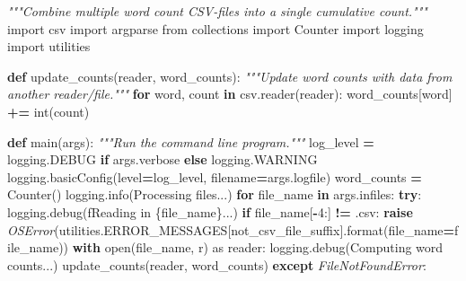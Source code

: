 \documentclass[
]{krantz}
\makeatletter
\newenvironment{Shaded}{\begin{snugshade}}{\end{snugshade}}
\newcommand{\BuiltInTok}[1]{#1}
\newcommand{\CommentTok}[1]{\textcolor[rgb]{0.56,0.35,0.01}{\textit{#1}}}
\newcommand{\ControlFlowTok}[1]{\textcolor[rgb]{0.13,0.29,0.53}{\textbf{#1}}}
\newcommand{\DecValTok}[1]{\textcolor[rgb]{0.00,0.00,0.81}{#1}}
\newcommand{\ImportTok}[1]{#1}
\newcommand{\KeywordTok}[1]{\textcolor[rgb]{0.13,0.29,0.53}{\textbf{#1}}}
\newcommand{\NormalTok}[1]{#1}
\newcommand{\OperatorTok}[1]{\textcolor[rgb]{0.81,0.36,0.00}{\textbf{#1}}}
\newcommand{\PreprocessorTok}[1]{\textcolor[rgb]{0.56,0.35,0.01}{\textit{#1}}}
\newcommand{\SpecialCharTok}[1]{\textcolor[rgb]{0.00,0.00,0.00}{#1}}
\newcommand{\SpecialStringTok}[1]{\textcolor[rgb]{0.31,0.60,0.02}{#1}}
\newcommand{\StringTok}[1]{\textcolor[rgb]{0.31,0.60,0.02}{#1}}
\newenvironment{kframe}{%
\medskip{}
\setlength{\fboxsep}{.8em}
 \def\at@end@of@kframe{}%
 \ifinner\ifhmode%
  \def\at@end@of@kframe{\end{minipage}}%
  \begin{minipage}{\columnwidth}%
 \fi\fi%
 \def\FrameCommand##1{\hskip\@totalleftmargin \hskip-\fboxsep
 \colorbox{shadecolor}{##1}\hskip-\fboxsep
     \hskip-\linewidth \hskip-\@totalleftmargin \hskip\columnwidth}%
 \MakeFramed {\advance\hsize-\width
   \@totalleftmargin\z@ \linewidth\hsize
   \@setminipage}}%
 {\par\unskip\endMakeFramed%
 \at@end@of@kframe}
\renewenvironment{Shaded}{\begin{kframe}}{\end{kframe}}
\makeatother
\begin{document}
\begin{Shaded}
\begin{Highlighting}[]
\CommentTok{"""Combine multiple word count CSV{-}files into a single cumulative count."""}
\ImportTok{import}\NormalTok{ csv}
\ImportTok{import}\NormalTok{ argparse}
\ImportTok{from}\NormalTok{ collections }\ImportTok{import}\NormalTok{ Counter}
\ImportTok{import}\NormalTok{ logging}
\ImportTok{import}\NormalTok{ utilities}


\KeywordTok{def}\NormalTok{ update\_counts(reader, word\_counts):}
    \CommentTok{"""Update word counts with data from another reader/file."""}
    \ControlFlowTok{for}\NormalTok{ word, count }\KeywordTok{in}\NormalTok{ csv.reader(reader):}
\NormalTok{        word\_counts[word] }\OperatorTok{+=} \BuiltInTok{int}\NormalTok{(count)}

\KeywordTok{def}\NormalTok{ main(args):}
    \CommentTok{"""Run the command line program."""}
\NormalTok{    log\_level }\OperatorTok{=}\NormalTok{ logging.DEBUG }\ControlFlowTok{if}\NormalTok{ args.verbose }\ControlFlowTok{else}\NormalTok{ logging.WARNING}
\NormalTok{    logging.basicConfig(level}\OperatorTok{=}\NormalTok{log\_level, filename}\OperatorTok{=}\NormalTok{args.logfile)}
\NormalTok{    word\_counts }\OperatorTok{=}\NormalTok{ Counter()}
\NormalTok{    logging.info(}\StringTok{\textquotesingle{}Processing files...\textquotesingle{}}\NormalTok{)}
    \ControlFlowTok{for}\NormalTok{ file\_name }\KeywordTok{in}\NormalTok{ args.infiles:}
        \ControlFlowTok{try}\NormalTok{:}
\NormalTok{            logging.debug(}\SpecialStringTok{f\textquotesingle{}Reading in }\SpecialCharTok{\{}\NormalTok{file\_name}\SpecialCharTok{\}}\SpecialStringTok{...\textquotesingle{}}\NormalTok{)}
            \ControlFlowTok{if}\NormalTok{ file\_name[}\OperatorTok{{-}}\DecValTok{4}\NormalTok{:] }\OperatorTok{!=} \StringTok{\textquotesingle{}.csv\textquotesingle{}}\NormalTok{:}
                \ControlFlowTok{raise} \PreprocessorTok{OSError}\NormalTok{(utilities.ERROR\_MESSAGES[}\StringTok{\textquotesingle{}not\_csv\_file\_suffix\textquotesingle{}}\NormalTok{].}\BuiltInTok{format}\NormalTok{(file\_name}\OperatorTok{=}\NormalTok{file\_name))}
            \ControlFlowTok{with} \BuiltInTok{open}\NormalTok{(file\_name, }\StringTok{\textquotesingle{}r\textquotesingle{}}\NormalTok{) }\ImportTok{as}\NormalTok{ reader:}
\NormalTok{                logging.debug(}\StringTok{\textquotesingle{}Computing word counts...\textquotesingle{}}\NormalTok{)}
\NormalTok{                update\_counts(reader, word\_counts)}
        \ControlFlowTok{except} \PreprocessorTok{FileNotFoundError}\NormalTok{:}

\end{Highlighting}
\end{Shaded}
\end{document}
